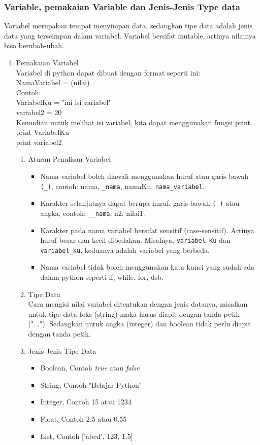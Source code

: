 \subsubsection{Variable, pemakaian Variable dan Jenis-Jenis Type data}
Variabel merupakan tempat menyimpan data, sedangkan tipe data adalah jenis data yang terseimpan dalam variabel. Variabel bersifat mutable, artinya nilainya bisa berubah-ubah.
\begin{enumerate}
\item Pemakaian Variabel\\
Variabel di python dapat dibuat dengan format seperti ini:\\
NamaVariabel = (nilai)\\
Contoh:\\
VariabelKu = "ini isi variabel"\\
variabel2 = 20\\
Kemudian untuk melihat isi variabel, kita dapat menggunakan fungsi print.\\
print VariabelKu\\
print variabel2\\
\begin{enumerate}
\item Aturan Penulisan Variabel
\begin{itemize}
\item Nama variabel boleh diawali menggunakan huruf atau garis bawah \verb|(_)|, contoh: nama, \verb|_nama|, namaKu, \verb|nama_variabel|.
\item Karakter selanjutnya dapat berupa huruf, garis bawah \verb|(_)| atau angka, contoh: \verb|__nama|, n2, nilai1.
\item Karakter pada nama variabel bersifat sensitif (case-sensitif). Artinya huruf besar dan kecil dibedakan. Misalnya, \verb|variabel_Ku| dan \verb|variabel_ku|, keduanya adalah variabel yang berbeda.
\item Nama variabel tidak boleh menggunakan kata kunci yang sudah ada dalam python seperti if, while, for, dsb.
\end{itemize}
\item Tipe Data\\
Cara mengisi nilai variabel ditentukan dengan jenis datanya, misalkan untuk tipe data teks (string) maka harus diapit dengan tanda petik ("..."). Sedangkan untuk angka (integer) dan boolean tidak perlu diapit dengan tanda petik.\\
\item Jenis-Jenis Tipe Data\\
\begin{itemize}
\item Boolean, Contoh \textit{true} atau \textit{false}
\item String, Contoh "Belajar Python"
\item Integer, Contoh 15 atau 1234
\item Float, Contoh 2.5 atau 0.55
\item List, Contoh ['abcd', 123, 1.5]
\end{itemize}
\end{enumerate}


\end{enumerate}

